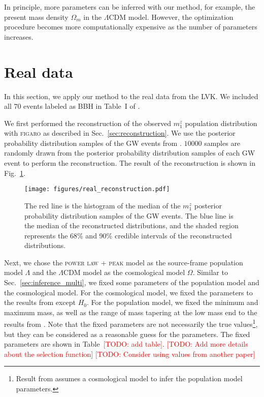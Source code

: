 \documentclass[twocolumn]{aastex631}
\newcommand{\todo}[1]{\textcolor{red}{[TODO: #1]}}
\begin{document}
In principle, more parameters can be inferred with our method, for example, the present mass density $\Omega_m$ in the $\Lambda$CDM model.
However, the optimization procedure becomes more computationally expensive as the number of parameters increases.

\section{Real data}
\label{sec:real_data}

In this section, we apply our method to the real data from the \ac{LVK}.
We included all $70$ events labeled as BBH in Table~I of \citet{KAGRA:2021duu}.

We first performed the reconstruction of the observed $m^z_1$ population distribution with \textsc{figaro} as described in Sec.~\ref{sec:reconstruction}.
We use the posterior probability distribution samples of the \ac{GW} events from \citet{LIGOScientific:2019lzm, KAGRA:2023pio}.
$10000$ samples are randomly drawn from the posterior probability distribution samples of each \ac{GW} event to perform the reconstruction.
The result of the reconstruction is shown in Fig.~\ref{fig:real_reconstruction}.

\begin{figure}[h]
    \texttt{[image: figures/real\_reconstruction.pdf]}
    \caption{
        The red line is the histogram of the median of the $m^z_1$ posterior probability distribution samples of the \ac{GW} events.
        The blue line is the median of the reconstructed distributions, and the shaded region represents the 68\% and 90\% credible intervals of the reconstructed distributions.
    }
    \label{fig:real_reconstruction}
\end{figure}

Next, we chose the \textsc{power law + peak} model as the source-frame population model $\Lambda$ and the $\Lambda$CDM model as the cosmological model $\Omega$.
Similar to Sec.~\ref{sec:inference_multi}, we fixed some parameters of the population model and the cosmological model.
For the cosmological model, we fixed the parameters to the results from \citet{Planck:2018vyg} except $H_0$.
For the population model, we fixed the minimum and maximum mass, as well as the range of mass tapering at the low mass end to the results from \citet{KAGRA:2021duu}.
Note that the fixed parameters are not necessarily the true values\footnote{Result from \citet{KAGRA:2021duu} assumes a cosmological model to infer the population model parameters.}, but they can be considered as a reasonable guess for the parameters.
The fixed parameters are shown in Table~\todo{add table}.
\todo{Add more details about the selection function}
\todo{Consider using values from another paper}
\end{document}
